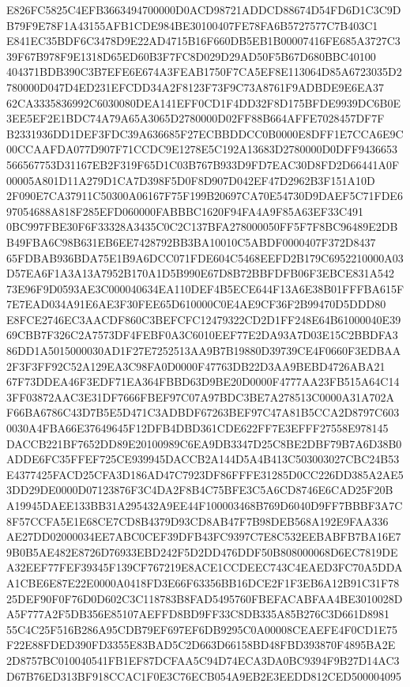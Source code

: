 \documentclass[UTF8,fontset=fandol,zihao=-4,a4paper]{ctexart}
\begin{document}
{{E826FC5825C4EFB3663494700000D0ACD98721ADDCD88674D54FD6D1C3C9DB79F9E78F1A43155AFB1CDE984BE30100407FE78FA6B5727577C7B403C1
E841EC35BDF6C3478D9E22AD4715B16F660DB5EB1B00007416FE685A3727C339F67B978F9E1318D65ED60B3F7FC8D029D29AD50F5B67D680BBC40100
404371BDB390C3B7EFE6E674A3FEAB1750F7CA5EF8E113064D85A6723035D2780000D047D4ED231EFCDD34A2F8123F73F9C73A8761F9ADBDE9E6EA37
62CA3335836992C6030080DEA141EFF0CD1F4DD32F8D175BFDE9939DC6B0E3EE5EF2E1BDC74A79A65A3065D2780000D02FF88B664AFFE7028457DF7F
B2331936DD1DEF3FDC39A636685F27ECBBDDCC0B0000E8DFF1E7CCA6E9C00CCAAFDA077D907F71CCDC9E1278E5C192A13683D2780000D0DFF9436653
566567753D31167EB2F319F65D1C03B767B933D9FD7EAC30D8FD2D66441A0F00005A801D11A279D1CA7D398F5D0F8D907D042EF47D2962B3F151A10D
2F090E7CA37911C50300A06167F75F199B20697CA70E54730D9DAEF5C71FDE697054688A818F285EFD060000FABBBC1620F94FA4A9F85A63EF33C491
0BC997FBE30F6F33328A3435C0C2C137BFA278000050FF5F7F8BC96489E2DBB49FBA6C98B631EB6EE7428792BB3BA10010C5ABDF0000407F372D8437
65FDBAB936BDA75E1B9A6DCC071FDE604C5468EEFD2B179C6952210000A03D57EA6F1A3A13A7952B170A1D5B990E67D8B72BBFDFB06F3EBCE831A542
73E96F9D0593AE3C000040634EA110DEF4B5ECE644F13A6E38B01FFFBA615F7E7EAD034A91E6AE3F30FEE65D610000C0E4AE9CF36F2B99470D5DDD80
E8FCE2746EC3AACDF860C3BEFCFC12479322CD2D1FF248E64B61000040E3969CBB7F326C2A7573DF4FEBF0A3C6010EEF77E2DA93A7D03E15C2BBDFA3
86DD1A5015000030AD1F27E7252513AA9B7B19880D39739CE4F0660F3EDBAA2F3F3FF92C52A129EA3C98FA0D0000F47763DB22D3AA9BEBD4726ABA21
67F73DDEA46F3EDF71EA364FBBD63D9BE20D0000F4777AA23FB515A64C143FF03872AAC3E31DF7666FBEF97C07A97BDC3BE7A278513C0000A31A702A
F66BA6786C43D7B5E5D471C3ADBDF67263BEF97C47A81B5CCA2D8797C6030030A4FBA66E37649645F12DFB4DBD361CDE622FF7E3EFFF27558E978145
DACCB221BF7652DD89E20100989C6EA9DB3347D25C8BE2DBF79B7A6D38B0ADDE6FC35FFEF725CE939945DACCB2A144D5A4B413C503003027CBC24B53
E4377425FACD25CFA3D186AD47C7923DF86FFFE31285D0CC226DD385A2AE53DD29DE0000D07123876F3C4DA2F8B4C75BFE3C5A6CD8746E6CAD25F20B
A19945DAEE133BB31A295432A9EE44F100003468B769D6040D9FF7BBBF3A7C8F57CCFA5E1E68CE7CD8B4379D93CD8AB47F7B98DEB568A192E9FAA336
AE27DD02000034EE7ABC0CEF39DFB43FC9397C7E8C532EEBABFB7BA16E79B0B5AE482E8726D76933EBD242F5D2DD476DDF50B808000068D6EC7819DE
A32EEF77FEF39345F139CF767219E8ACE1CCDEEC743C4EAED3FC70A5DDAA1CBE6E87E22E0000A0418FD3E66F63356BB16DCE2F1F3EB6A12B91C31F78
25DEF90F0F76D0D602C3C118783B8FAD5495760FBEFACABFAA4BE3010028DA5F777A2F5DB356E85107AEFFD8BD9FF33C8DB335A85B276C3D661D8981
55C4C25F516B286A95CDB79EF697EF6DB9295C0A00008CEAEFE4F0CD1E75F22E88FDED390FD3355E83BAD5C2D663D66158BD48FBD393870F4895BA2E
2D8757BC010040541FB1EF87DCFAA5C94D74ECA3DA0BC9394F9B27D14AC3D67B76ED313BF918CCAC1F0E3C76ECB054A9EB2E3EEDD812CED500004095
}}
\end{document}
